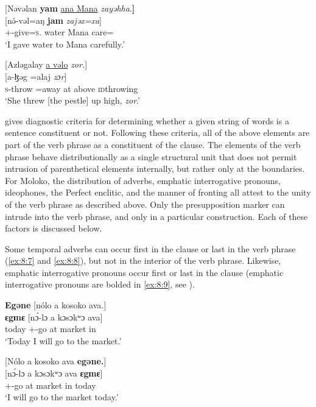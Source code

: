 \ea \label{ex:8:5}
{}[Nəvəlan  \textbf{yam}  \underline{ana  Mana}  \textit{zayəhha}.\textbf{]}\\
\gll \textup{[}n\'{ə}-vəl=aŋ    \textbf{jam}      \textit{zajəx=xa}\textup{]}\\
{\oneS}+{\PFV}-give=\textsc{s}.{\IO}  water  {\DAT} Mana  care={\ADV}\\
\glt ‘I gave water to Mana carefully.’
\z

\ea \label{ex:8:6}
{}[Azləgalay \underline{a  vəlo} \textit{zor.}]\\
\gll {}[a-ɮəg =alaj    \textit{zɔr}]\\
\textsc{s}-throw =away    at  above  \textsc{id}throwing\\
\glt ‘She threw [the pestle] up high, \textit{zor}.’
\z

\citet[69]{Radford1981} gives diagnostic criteria for determining whether a given string of words is a sentence constituent or not. Following these criteria, all of the above elements are part of the verb phrase as a constituent of the clause. The elements of the verb phrase behave distributionally as a single structural unit that does not permit intrusion of parenthetical elements internally, but rather only at the boundaries. For Moloko, the distribution of adverbs, emphatic interrogative pronouns, ideophones, the Perfect enclitic, and the manner of fronting all attest to the unity of the verb phrase as described above. Only the presupposition marker can intrude into the verb phrase, and only in a particular construction. Each of these factors is discussed below. 

Some temporal adverbs can occur first in the clause or last in the verb phrase (\ref{ex:8:7} and \ref{ex:8:8}), but not in the interior of the verb phrase. Likewise, emphatic interrogative pronouns occur first or last in the clause (emphatic interrogative pronouns are bolded in \ref{ex:8:9}, see ). 

\ea \label{ex:8:7}
\textbf{Egəne}  [nólo  a  kosoko  ava.]\\
\gll  \textbf{ɛgɪnɛ}  [n\'{ɔ}-lɔ     a  kɔsɔkʷɔ  ava]\\
      today  {\oneS}+{\IFV}-go  at  market  in\\
\glt  ‘Today I will go to the market.'
\z

\ea \label{ex:8:8}
{}[Nólo  a  kosoko  ava  \textbf{egəne.}]\\
\gll  {}[n\'ɔ-lɔ   a  kɔsɔkʷɔ  ava  \textbf{ɛgɪnɛ}]\\
      {\oneS}+{\IFV}-go  at  market  in  today\\
\glt  ‘I will go to the market today.'
\z

